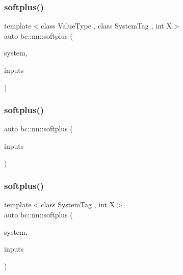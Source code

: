 \mbox{\label{namespacebc_1_1nn_ad623041ec1815227dcfcde29e6c41761}} 
\subsubsection{\texorpdfstring{softplus()}{softplus()}\hspace{0.1cm}{\footnotesize\ttfamily [3/5]}}
{\footnotesize\ttfamily template$<$class Value\+Type , class System\+Tag , int X$>$ \\
auto bc\+::nn\+::softplus (\begin{DoxyParamCaption}\item[{System\+Tag}]{system,  }\item[{\hyperlink{structbc_1_1Dim}{bc\+::\+Dim}$<$ X $>$}]{inputs }\end{DoxyParamCaption})}

\mbox{\label{namespacebc_1_1nn_a2da6aad8df7a81917589a72c77aa04e1}} 
\subsubsection{\texorpdfstring{softplus()}{softplus()}\hspace{0.1cm}{\footnotesize\ttfamily [4/5]}}
{\footnotesize\ttfamily auto bc\+::nn\+::softplus (\begin{DoxyParamCaption}\item[{\hyperlink{namespacebc_aaf8e3fbf99b04b1b57c4f80c6f55d3c5}{bc\+::size\+\_\+t}}]{inputs }\end{DoxyParamCaption})}

\mbox{\label{namespacebc_1_1nn_a9f5f7e6d8257036f54139f9a984aa22e}} 
\subsubsection{\texorpdfstring{softplus()}{softplus()}\hspace{0.1cm}{\footnotesize\ttfamily [5/5]}}
{\footnotesize\ttfamily template$<$class System\+Tag , int X$>$ \\
auto bc\+::nn\+::softplus (\begin{DoxyParamCaption}\item[{System\+Tag}]{system,  }\item[{\hyperlink{structbc_1_1Dim}{bc\+::\+Dim}$<$ X $>$}]{inputs }\end{DoxyParamCaption})}

